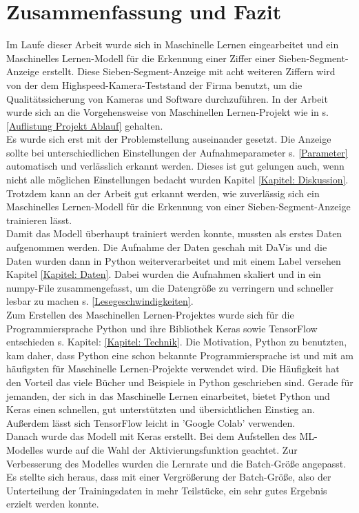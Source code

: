 \section{Zusammenfassung und Fazit}
Im Laufe dieser Arbeit wurde sich in Maschinelle Lernen eingearbeitet und ein Maschinelles Lernen-Modell für die Erkennung einer Ziffer  einer Sieben-Segment-Anzeige erstellt. Diese Sieben-Segment-Anzeige mit  acht weiteren  Ziffern wird von der dem Highspeed-Kamera-Teststand der Firma benutzt,  um die Qualitätssicherung von Kameras und Software durchzuführen.  In der Arbeit wurde sich an die Vorgehensweise von Maschinellen Lernen-Projekt wie in s. \ref{Auflistung Projekt Ablauf} gehalten. \\
Es wurde sich erst mit der Problemstellung auseinander gesetzt. Die Anzeige sollte bei unterschiedlichen Einstellungen der Aufnahmeparameter s. \ref{Parameter} automatisch und verlässlich erkannt werden. Dieses ist gut gelungen auch, wenn nicht alle möglichen Einstellungen bedacht wurden Kapitel \ref{Kapitel: Diskussion}.  Trotzdem kann an der Arbeit gut erkannt werden, wie zuverlässig sich ein Maschinelles Lernen-Modell für die Erkennung von einer Sieben-Segment-Anzeige trainieren lässt.\\
Damit das Modell überhaupt trainiert werden konnte, mussten als erstes Daten aufgenommen werden. Die Aufnahme der Daten geschah mit DaVis und die Daten wurden dann in Python weiterverarbeitet und mit einem Label versehen Kapitel \ref{Kapitel: Daten}. Dabei wurden die Aufnahmen skaliert und in ein numpy-File zusammengefasst,  um die Datengröße zu verringern und schneller lesbar zu machen s. \ref{Lesegeschwindigkeiten}.\\
Zum Erstellen des Maschinellen Lernen-Projektes wurde sich für die Programmiersprache Python und ihre Bibliothek Keras sowie TensorFlow entschieden s.  Kapitel: \ref{Kapitel: Technik}. Die Motivation,  Python zu benutzten,  kam daher, dass Python eine schon bekannte Programmiersprache ist und mit am häufigsten für Maschinelle Lernen-Projekte verwendet wird.  Die Häufigkeit hat den Vorteil das viele Bücher und Beispiele in Python geschrieben sind. Gerade für jemanden,  der sich in das Maschinelle Lernen einarbeitet,  bietet Python und Keras einen schnellen, gut unterstützten und übersichtlichen Einstieg an.  Außerdem lässt sich TensorFlow leicht in 'Google Colab' verwenden.\\
Danach wurde das Modell mit Keras erstellt.  Bei dem Aufstellen des ML-Modelles wurde auf die Wahl der Aktivierungsfunktion geachtet. Zur Verbesserung des Modelles wurden die Lernrate und die Batch-Größe angepasst.  Es stellte sich heraus,  dass mit einer Vergrößerung der Batch-Größe,  also der Unterteilung der Trainingsdaten in mehr Teilstücke, ein sehr gutes Ergebnis erzielt werden konnte. 
